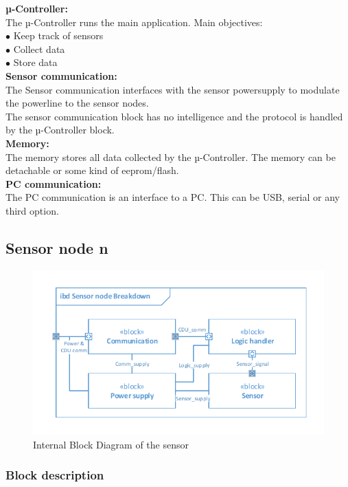 \textbf{µ-Controller:}\\
The µ-Controller runs the main application. Main objectives:\\
$\bullet$ Keep track of sensors\\
$\bullet$ Collect data\\
$\bullet$ Store data\\

\textbf{Sensor communication:}\\
The Sensor communication interfaces with the sensor powersupply to modulate the powerline to the sensor nodes.\\
The sensor communication block has no intelligence and the protocol is handled by the µ-Controller block.\\

\textbf{Memory:}\\
The memory stores all data collected by the µ-Controller. The memory can be detachable or some kind of eeprom/flash.\\

\textbf{PC communication:}\\
The PC communication is an interface to a PC. This can be USB, serial or any third option.\\


\subsection{Sensor node n}

\begin{figure}[hbpt]
\centering
\includegraphics[width=.8\textwidth]{billeder/Sensor_IBD}
\caption{Internal Block Diagram of the sensor}
\label{Sensor_IBD}
\end{figure}

\subsubsection{Block description}

